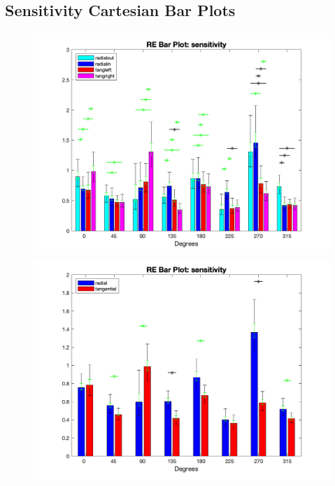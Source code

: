 \documentclass[11pt]{article} %
\begin{document}
\subsection{Sensitivity Cartesian Bar Plots}
\begin{figure}[H]
\centering %
\includegraphics[scale=.35]{Images/RE_BP_sensitivity_Alldata_4conds.png}
\includegraphics[scale=.35]{Images/RE_BP_sensitivity_Alldata_2conds.png}
\end{figure}
\end{document}

